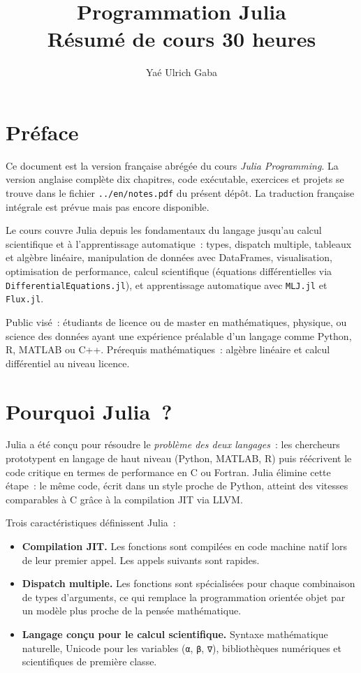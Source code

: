 \documentclass[12pt,a4paper]{article}
\title{\textbf{Programmation Julia}\\[0.4em]
       \large Résumé de cours \textendash{} 30 heures}
\author{Yaé Ulrich Gaba}
\date{}
\begin{document}
\maketitle

\section*{Préface}

Ce document est la version française abrégée du cours \emph{Julia Programming}. La version anglaise complète \textendash{} dix chapitres, code exécutable, exercices et projets \textendash{} se trouve dans le fichier \texttt{../en/notes.pdf} du présent dépôt. La traduction française intégrale est prévue mais pas encore disponible.

Le cours couvre Julia depuis les fondamentaux du langage jusqu'au calcul scientifique et à l'apprentissage automatique~: types, dispatch multiple, tableaux et algèbre linéaire, manipulation de données avec DataFrames, visualisation, optimisation de performance, calcul scientifique (équations différentielles via \texttt{DifferentialEquations.jl}), et apprentissage automatique avec \texttt{MLJ.jl} et \texttt{Flux.jl}.

Public visé~: étudiants de licence ou de master en mathématiques, physique, ou science des données ayant une expérience préalable d'un langage comme Python, R, MATLAB ou C++. Prérequis mathématiques~: algèbre linéaire et calcul différentiel au niveau licence.

\section*{Pourquoi Julia~?}

Julia a été conçu pour résoudre le \emph{problème des deux langages}~: les chercheurs prototypent en langage de haut niveau (Python, MATLAB, R) puis réécrivent le code critique en termes de performance en C ou Fortran. Julia élimine cette étape~: le même code, écrit dans un style proche de Python, atteint des vitesses comparables à C grâce à la compilation JIT via LLVM.

Trois caractéristiques définissent Julia~:
\begin{itemize}[leftmargin=1.5em]
  \item \textbf{Compilation JIT.} Les fonctions sont compilées en code machine natif lors de leur premier appel. Les appels suivants sont rapides.
  \item \textbf{Dispatch multiple.} Les fonctions sont spécialisées pour chaque combinaison de types d'arguments, ce qui remplace la programmation orientée objet par un modèle plus proche de la pensée mathématique.
  \item \textbf{Langage conçu pour le calcul scientifique.} Syntaxe mathématique naturelle, Unicode pour les variables (\verb|α|, \verb|β|, \verb|∇|), bibliothèques numériques et scientifiques de première classe.
\end{itemize}
\end{document}
